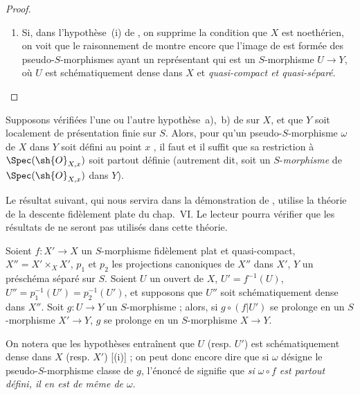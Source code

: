 \begin{proof}
\begin{remarks}[20.3.8.7]
\begin{enumerate}[label=(\roman*)]
  \item Si, dans l'hypothèse~(i) de , on supprime la condition que $X$ est noethérien, on voit que le raisonnement de  montre encore que l'image de  est formée des pseudo-$S$-morphismes ayant un représentant qui est un $S$-morphisme $U\to Y$, où $U$ est schématiquement dense dans $X$ et \emph{quasi-compact et quasi-séparé}.
\end{enumerate}
\end{remarks}
\end{proof}

\begin{corollary}[20.3.9]
\label{IV.20.3.9}
Supposons vérifiées l'une ou l'autre hypothèse~\textup{a)},~\textup{b)} de  sur $X$, et que $Y$ soit localement de présentation finie sur $S$.
Alors, pour qu'un pseudo-$S$-morphisme $\omega$ de $X$ dans $Y$ soit défini au point $x$ , il faut et il suffit que sa restriction à $\Spec(\sh{O}_{X,x})$ soit partout définie \textup{(autrement dit, soit un $S$-\emph{morphisme} de $\Spec(\sh{O}_{X,x})$ dans $Y$)}.
\end{corollary}

Le résultat suivant, qui nous servira dans la démonstration de , utilise la théorie de la descente fidèlement plate du chap.~VI.
Le lecteur pourra vérifier que les résultats de  ne seront pas utilisés dans cette théorie.

\begin{lemma}[20.3.10]
\label{IV.20.3.10}
Soient $f:X'\to X$ un $S$-morphisme fidèlement plat et quasi-compact, $X''=X'\times_X X'$, $p_1$ et $p_2$ les projections canoniques de $X''$ dans $X'$, $Y$ un préschéma séparé sur $S$.
Soient $U$ un ouvert de $X$, $U'=f^{-1}(U)$, $U''=p_1^{-1}(U')=p_2^{-1}(U')$, et supposons que $U''$ soit schématiquement dense dans $X''$.
Soit $g:U\to Y$ un $S$-morphisme ; alors, si $g\circ(f|U')$ se prolonge en un $S$-morphisme $X'\to Y$, $g$ se prolonge en un $S$-morphisme $X\to Y$.
\end{lemma}

On notera que les hypothèses entraînent que $U$ (resp. $U'$) est schématiquement dense dans $X$ (resp. $X'$) [(i)] ; on peut donc encore dire que si $\omega$ désigne le pseudo-$S$-morphisme classe de $g$, l'énoncé de  signifie que \emph{si $\omega\circ f$ est partout défini, il en est de même de $\omega$}.


